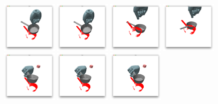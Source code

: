 \begin{figure}[t]
\includegraphics[width=0.24\textwidth]{images/Pan4_2_HFLW}
\includegraphics[width=0.24\textwidth]{images/Pan4_2_LFLW}
\includegraphics[width=0.24\textwidth]{images/Pan4_2_HFHW}
\includegraphics[width=0.24\textwidth]{images/Pan4_2_LFHW}\\
\includegraphics[width=0.24\textwidth]{images/Pan4_HFLW}
\includegraphics[width=0.24\textwidth]{images/Pan4_LFLW}
\includegraphics[width=0.24\textwidth]{images/Pan4_HFHW}

\end{figure}
